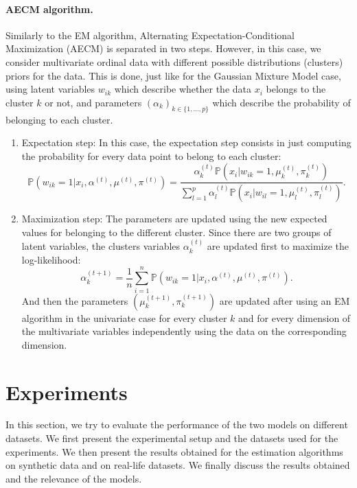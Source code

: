 \documentclass[a4paper,12pt]{article}
\begin{document}
\paragraph{AECM algorithm.} Similarly to the EM algorithm, Alternating Expectation-Conditional Maximization (AECM) \citep{meng1997algorithm} is separated in two steps. However, in this case, we consider multivariate ordinal data with different possible distributions (clusters) priors for the data. This is done, just like for the Gaussian Mixture Model case, using latent variables $w_{ik}$ which describe whether the data $x_i$ belongs to the cluster $k$ or not, and parameters $(\alpha_k)_{k\in \{1, \ldots, p\}}$ which describe the probability of belonging to each cluster. 
\begin{enumerate}
    \item Expectation step: In this case, the expectation step consists in just computing the probability for every data point to belong to each cluster:
    \begin{equation}
        \mathbb{P}(w_{ik}=1|x_i, \alpha^{(t)}, \mu^{(t)}, \pi^{(t)}) = \frac{\alpha_k^{(t)}\mathbb{P}(x_i|w_{ik}=1, \mu_k^{(t)}, \pi_k^{(t)})}{\sum_{l=1}^p\alpha_l^{(t)}\mathbb{P}(x_i|w_{il}=1, \mu_l^{(t)}, \pi_l^{(t)})}.
    \end{equation}
    \item Maximization step: The parameters are updated using the new expected values for belonging to the different cluster. Since there are two groups of latent variables, the clusters variables $\alpha_k^{(t)}$ are updated first to maximize the log-likelihood:
    \begin{equation}
    \alpha_k^{(t+1)} = \frac{1}{n} \sum_{i=1}^n \mathbb{P}(w_{ik}=1|x_i, \alpha^{(t)}, \mu^{(t)}, \pi^{(t)}).
    \end{equation}
    And then the parameters $(\mu_k^{(t+1)}, \pi_k^{(t+1)})$ are updated after using an EM algorithm in the univariate case for every cluster $k$ and for every dimension of the multivariate variables independently using the data on the corresponding dimension.
\end{enumerate}





\section{Experiments}
In this section, we try to evaluate the performance of the two models on different datasets. We first present the experimental setup and the datasets used for the experiments. We then present the results obtained for the estimation algorithms on synthetic data and on real-life datasets. We finally discuss the results obtained and the relevance of the models. 
\end{document}
